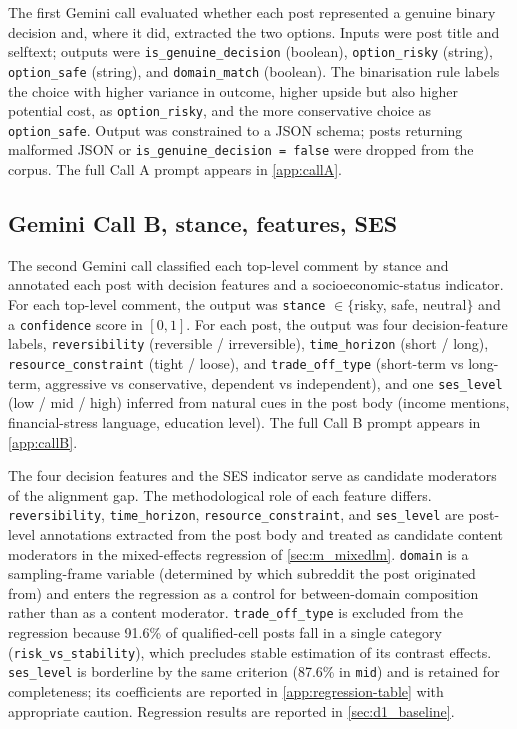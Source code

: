 The first Gemini call evaluated whether each post represented a
genuine binary decision and, where it did, extracted the two options.
Inputs were post title and selftext; outputs were
\texttt{is\_genuine\_decision} (boolean), \texttt{option\_risky}
(string), \texttt{option\_safe} (string), and \texttt{domain\_match}
(boolean). The binarisation rule labels the choice with higher variance
in outcome, higher upside but also higher potential cost, as
\texttt{option\_risky}, and the more conservative choice as
\texttt{option\_safe}. Output was constrained to a JSON schema; posts
returning malformed JSON or \texttt{is\_genuine\_decision = false} were
dropped from the corpus. The full Call A prompt appears in
\cref{app:callA}.

\subsection{Gemini Call B, stance, features, SES}
\label{sec:m_callB}

The second Gemini call classified each top-level comment by stance and
annotated each post with decision features and a socioeconomic-status
indicator. For each top-level comment, the output was
\texttt{stance} $\in \{$risky, safe, neutral$\}$ and a
\texttt{confidence} score in $[0, 1]$. For each post, the output was
four decision-feature labels, \texttt{reversibility} (reversible /
irreversible), \texttt{time\_horizon} (short / long),
\texttt{resource\_constraint} (tight / loose), and
\texttt{trade\_off\_type} (short-term vs long-term, aggressive vs
conservative, dependent vs independent), and one
\texttt{ses\_level} (low / mid / high) inferred from natural cues in
the post body (income mentions, financial-stress language, education
level). The full Call B prompt appears in \cref{app:callB}.

The four decision features and the SES indicator serve as candidate
moderators of the alignment gap. The methodological role of each
feature differs. \texttt{reversibility}, \texttt{time\_horizon},
\texttt{resource\_constraint}, and \texttt{ses\_level} are post-level
annotations extracted from the post body and treated as candidate
content moderators in the mixed-effects regression of
\cref{sec:m_mixedlm}. \texttt{domain} is a sampling-frame variable
(determined by which subreddit the post originated from) and enters
the regression as a control for between-domain composition rather than
as a content moderator. \texttt{trade\_off\_type} is excluded from the
regression because 91.6\% of qualified-cell posts fall in a single
category (\texttt{risk\_vs\_stability}), which precludes stable
estimation of its contrast effects. \texttt{ses\_level} is borderline
by the same criterion (87.6\% in \texttt{mid}) and is retained for
completeness; its coefficients are reported in
\cref{app:regression-table} with appropriate caution. Regression
results are reported in \cref{sec:d1_baseline}.


